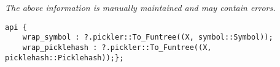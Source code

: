 \label{api:Symbol\_And\_Picklehash\_Pickling}

{\tiny \it The above information is manually maintained and may contain errors.}
\begin{verbatim}
api {
    wrap_symbol : ?.pickler::To_Funtree((X, symbol::Symbol));
    wrap_picklehash : ?.pickler::To_Funtree((X, picklehash::Picklehash));};
\end{verbatim}
